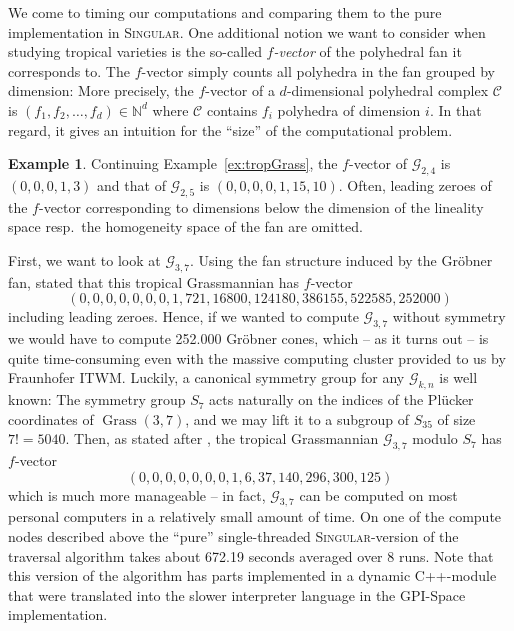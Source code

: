 \documentclass[
  paper=a4,
  titlepage,
  bibliography=totoc,
  pagesize=pdftex
]{scrartcl}
\numberwithin{figure}{section}
\numberwithin{equation}{section}
\numberwithin{table}{section}
\newcommand*\setN{\mathds{N}}
\DeclareMathOperator{\Grass}{Grass}
\theoremstyle{definition}
\newtheorem{example}[definition]{Example}
\numberwithin{definition}{section}
\begin{document}
We come to timing our computations and comparing them to the pure implementation in
\textsc{Singular}. One additional notion we want to consider when studying tropical
varieties is the so-called \emph{$f$-vector} of the polyhedral fan it corresponds to. The
$f$-vector simply counts all polyhedra in the fan grouped by dimension: More precisely,
the $f$-vector of a $d$-dimensional polyhedral complex $\mathcal C$ is $(f_1, f_2, \dots,
f_d) \in \setN^d$ where $\mathcal C$ contains $f_i$ polyhedra of dimension $i$. In that
regard, it gives an intuition for the \enquote{size} of the computational problem.

\begin{example} \label{ex:fVec}
  Continuing Example~\ref{ex:tropGrass}, the $f$-vector of $\mathcal G_{2,4}$ is
  $(0,0,0,1,3)$ and that of $\mathcal G_{2,5}$ is $(0,0,0,0,1,15,10)$. Often, leading
  zeroes of the $f$-vector corresponding to dimensions below the dimension of the
  lineality space resp.\ the homogeneity space of the fan are omitted.
\end{example}

First, we want to look at $\mathcal G_{3,7}$. Using the fan structure induced by the
Gröbner fan, \cite[Theorem~2.1]{tropPlane} stated that this tropical Grassmannian has
$f$-vector
\[
  (0,0,0,0,0,0,0,1,721,16800,124180,386155,522585,252000)
\]
including leading zeroes. Hence, if we wanted to compute $\mathcal G_{3,7}$ without
symmetry we would have to compute 252.000 Gröbner cones, which -- as it turns out -- is
quite time-consuming even with the massive computing cluster provided to us by Fraunhofer
ITWM. Luckily, a canonical symmetry group for any $\mathcal G_{k,n}$ is well known:
 The symmetry group $S_7$ acts naturally on the indices of the
Plücker coordinates of $\Grass(3,7)$, and we may lift it to a subgroup of $S_{35}$ of size
$7! = 5040$. Then, as stated after \cite[Theorem~2.2]{tropPlane}, the tropical
Grassmannian $\mathcal G_{3,7}$ modulo $S_7$ has $f$-vector
\[
  (0,0,0,0,0,0,0,1,6,37,140,296,300,125)
\]
which is much more manageable -- in fact, $\mathcal G_{3,7}$ can be computed on most
personal computers in a relatively small amount of time. On one of the compute nodes
described above the \enquote{pure} single-threaded \textsc{Singular}-version of the
traversal algorithm takes about {672.19} seconds averaged over 8 runs. Note that this
version of the algorithm has parts implemented in a dynamic \textsc{C++}-module that were
translated into the slower  interpreter language in the GPI-Space implementation.
\end{document}
